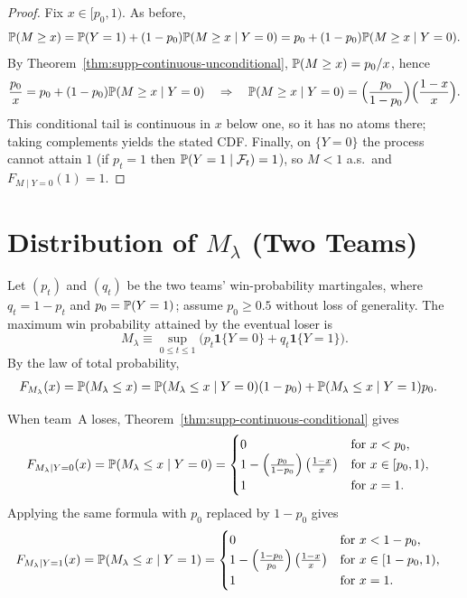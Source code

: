 \begin{proof}
Fix $x\in[p_0,1)$. As before,
\[
\P(M\ge x)=\P(Y=1)+(1-p_0)\P(M\ge x\mid Y=0)=p_0+(1-p_0)\P(M\ge x\mid Y=0).
\]
By Theorem~\ref{thm:supp-continuous-unconditional}, $\P(M\ge x)=p_0/x$, hence
\[
\frac{p_0}{x}=p_0+(1-p_0)\P(M\ge x\mid Y=0)
\quad\Rightarrow\quad
\P(M\ge x\mid Y=0)=\Big(\frac{p_0}{1-p_0}\Big)\Big(\frac{1-x}{x}\Big).
\]
This conditional tail is continuous in $x$ below one, so it has no atoms there; taking complements yields the stated CDF.
Finally, on $\{Y=0\}$ the process cannot attain $1$ (if $p_t=1$ then $\P(Y=1\mid\mathcal F_t)=1$), so $M<1$ a.s.\ and $F_{M\mid Y=0}(1)=1$.
\end{proof}

\section{Distribution of \texorpdfstring{$M_\lambda$}{M\_lambda} (Two Teams)} \label{app:two-player-derivation}

Let $(p_t)$ and $(q_t)$ be the two teams' win-probability martingales, where $q_t = 1 - p_t$ and $p_0 = \P(Y=1)$; assume $p_0 \ge 0.5$ without loss of generality.
The maximum win probability attained by the eventual loser is
\begin{equation} \label{eq:supp-M-lambda-def}
    M_\lambda \equiv \sup_{0 \leq t \leq 1} \Big( p_t \boldsymbol{1}\{Y = 0\} + q_t \boldsymbol{1}\{Y = 1\} \Big).
\end{equation}
By the law of total probability,
\begin{align} \label{eq:supp-M-lambda-total-prob}
    F_{M_\lambda}(x) = \P(M_\lambda \le x) &= \P(M_\lambda \le x \mid Y=0) (1-p_0) + \P(M_\lambda \le x \mid Y=1) p_0.
\end{align}

When team~A loses, Theorem~\ref{thm:supp-continuous-conditional} gives
\begin{align}
    F_{M_\lambda \mid Y=0}(x) = \P(M_\lambda \le x \mid Y = 0) &=
    \begin{cases}
        0 & \text{for } x < p_0, \\
        1 - \left(\frac{p_0}{1-p_0}\right) \left(\frac{1-x}{x}\right) & \text{for } x \in [p_0,1), \\
        1 & \text{for } x = 1.
    \end{cases} \label{eq:supp-M-lambda-A}
\end{align}
Applying the same formula with $p_0$ replaced by $1-p_0$ gives
\begin{align}
    F_{M_\lambda \mid Y=1}(x) = \P(M_\lambda \le x \mid Y = 1) &=
    \begin{cases}
        0 & \text{for } x < 1-p_0, \\
        1 - \left(\frac{1-p_0}{p_0}\right) \left(\frac{1-x}{x}\right) & \text{for } x \in [1-p_0,1), \\
        1 & \text{for } x = 1.
    \end{cases} \label{eq:supp-M-lambda-B}
\end{align}

